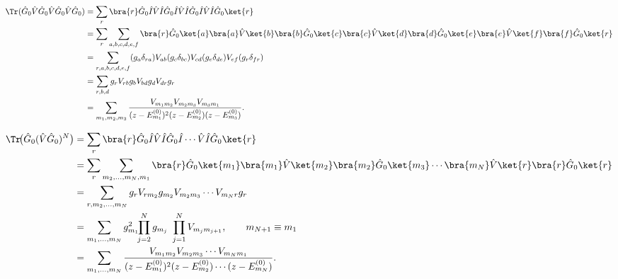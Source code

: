 \begin{align}
  \Tr(\hat G_0\hat V\hat G_0\hat V\hat
  G_0\hat V\hat G_0)
  &=\sum_{r}\bra{r}\hat G_0\hat I\hat V\hat I\hat G_0\hat
  I\hat V\hat I\hat G_0\hat I\hat V\hat I\hat
  G_0\ket{r} \notag\\
  &=\sum_{r}\sum_{a,b,c,d,e,f}
  \bra{r}\hat G_0\ket{a}\bra{a}\hat V\ket{b}\bra{b}\hat G_0\ket{c}
  \bra{c}\hat V\ket{d}\bra{d}\hat G_0\ket{e}
  \bra{e}\hat V\ket{f}\bra{f}\hat G_0\ket{r} \notag\\
  &=\sum_{r,a,b,c,d,e,f}
  (g_a\delta_{ra})V_{ab}(g_c\delta_{bc})V_{cd}
  (g_e\delta_{de})V_{ef}(g_r\delta_{fr}) \notag\\
  &=\sum_{r,b,d} g_rV_{rb}g_bV_{bd}g_dV_{dr}g_r \notag\\
  &=\sum_{m_1,m_2,m_3}
  \frac{V_{m_1 m_2}V_{m_2 m_3}V_{m_3 m_1}}
  {(z-E_{m_1}^{(0)})^2(z-E_{m_2}^{(0)})(z-E_{m_3}^{(0)})}.
  \label{eq:F3_explicit}
\end{align}

\begin{align}
  \Tr\!\big(\hat G_0(\hat V\hat G_0)^N\big)
  &=\sum_{r}\bra{r}\hat G_0\hat I\hat V\hat I\hat G_0\hat
  I\cdots\hat V\hat I\hat G_0\ket{r} \notag\\
  &=\sum_{r}\sum_{m_2,\dots,m_{N},m_1}
  \bra{r}\hat G_0\ket{m_1}\bra{m_1}\hat V\ket{m_2}\bra{m_2}\hat G_0\ket{m_3}
  \cdots
  \bra{m_N}\hat V\ket{r}\bra{r}\hat G_0\ket{r} \notag\\
  &=\sum_{r,m_2,\dots,m_N}
  g_rV_{r m_2}g_{m_2}V_{m_2 m_3}\cdots V_{m_N r}g_r \notag\\
  &=\sum_{m_1,\dots,m_N}
  g_{m_1}^2\!\!\prod_{j=2}^{N} g_{m_j}
  \ \prod_{j=1}^{N} V_{m_jm_{j+1}},\qquad m_{N+1}\equiv m_1 \notag\\
  &=\sum_{m_1,\dots,m_N}
  \frac{V_{m_1 m_2}V_{m_2 m_3}\cdots V_{m_N m_1}}
  {(z-E_{m_1}^{(0)})^2(z-E_{m_2}^{(0)})\cdots (z-E_{m_N}^{(0)})}.
  \label{eq:FN_explicit}
\end{align}

